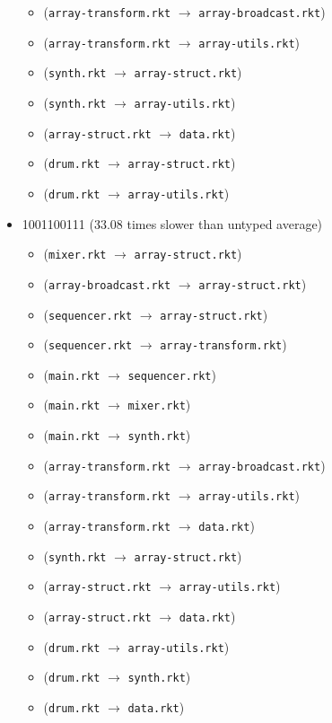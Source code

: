 \documentclass{article}
\newcommand{\mono}[1]{\texttt{#1}}
\begin{document}
\begin{itemize}
\begin{itemize}
  \item (\mono{array-transform.rkt} $\rightarrow$ \mono{array-broadcast.rkt})
  \item (\mono{array-transform.rkt} $\rightarrow$ \mono{array-utils.rkt})
  \item (\mono{synth.rkt} $\rightarrow$ \mono{array-struct.rkt})
  \item (\mono{synth.rkt} $\rightarrow$ \mono{array-utils.rkt})
  \item (\mono{array-struct.rkt} $\rightarrow$ \mono{data.rkt})
  \item (\mono{drum.rkt} $\rightarrow$ \mono{array-struct.rkt})
  \item (\mono{drum.rkt} $\rightarrow$ \mono{array-utils.rkt})
  \end{itemize}
\item 1001100111 (33.08 times slower than untyped average)
  \begin{itemize}
  \item (\mono{mixer.rkt} $\rightarrow$ \mono{array-struct.rkt})
  \item (\mono{array-broadcast.rkt} $\rightarrow$ \mono{array-struct.rkt})
  \item (\mono{sequencer.rkt} $\rightarrow$ \mono{array-struct.rkt})
  \item (\mono{sequencer.rkt} $\rightarrow$ \mono{array-transform.rkt})
  \item (\mono{main.rkt} $\rightarrow$ \mono{sequencer.rkt})
  \item (\mono{main.rkt} $\rightarrow$ \mono{mixer.rkt})
  \item (\mono{main.rkt} $\rightarrow$ \mono{synth.rkt})
  \item (\mono{array-transform.rkt} $\rightarrow$ \mono{array-broadcast.rkt})
  \item (\mono{array-transform.rkt} $\rightarrow$ \mono{array-utils.rkt})
  \item (\mono{array-transform.rkt} $\rightarrow$ \mono{data.rkt})
  \item (\mono{synth.rkt} $\rightarrow$ \mono{array-struct.rkt})
  \item (\mono{array-struct.rkt} $\rightarrow$ \mono{array-utils.rkt})
  \item (\mono{array-struct.rkt} $\rightarrow$ \mono{data.rkt})
  \item (\mono{drum.rkt} $\rightarrow$ \mono{array-utils.rkt})
  \item (\mono{drum.rkt} $\rightarrow$ \mono{synth.rkt})
  \item (\mono{drum.rkt} $\rightarrow$ \mono{data.rkt})

\end{itemize}
\end{itemize}
\end{document}
